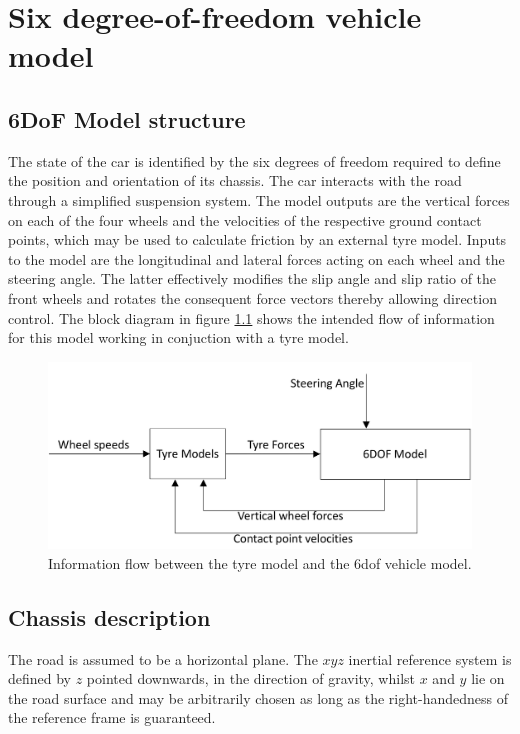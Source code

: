 \chapter{Six degree-of-freedom vehicle model}
\label{chap:6dof}
\section{6DoF Model structure}
\label{sec:6dofconcept}
The state of the car is identified by the six degrees of freedom required to define the position and orientation of its chassis. The car interacts with the road through a simplified suspension system.
The model outputs are the vertical forces on each of the four wheels and the velocities of the respective ground contact points, which may be used to calculate friction by an external tyre model.
Inputs to the model are the longitudinal and lateral forces acting on each wheel and the steering angle. The latter effectively modifies the slip angle and slip ratio of the front wheels and rotates the consequent force vectors thereby allowing direction control.
The block diagram in figure \ref{6flow} shows the intended flow of information for this model working in conjuction with a tyre model.
\begin{figure}[ht]
  \centering
  \includegraphics[width=\textwidth]{images/6flow.png}
  \caption{Information flow between the tyre model and the 6dof vehicle model.}
  \label{6flow}
\end{figure}
\section{Chassis description}
\label{sec:body}
The road is assumed to be a horizontal plane. The $xyz$ inertial reference system is defined by $z$ pointed downwards, in the direction of gravity, whilst $x$ and $y$ lie on the road surface and may be arbitrarily chosen as long as the right-handedness of the reference frame is guaranteed.

